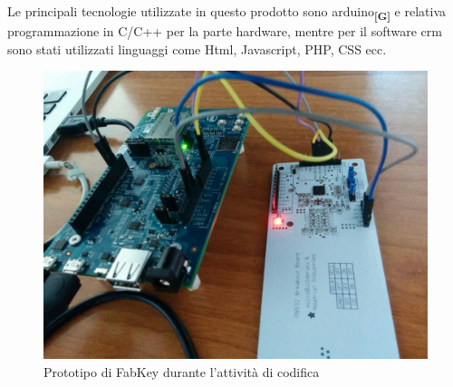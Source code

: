 Le principali tecnologie utilizzate in questo prodotto sono \gls{arduino}\textbf{\textsubscript{[G]}} e relativa programmazione in C/C++ per la parte hardware, mentre per il software crm sono stati utilizzati linguaggi come Html, Javascript, PHP, CSS ecc.

\begin{figure}[H]
	\begin{center}
	\includegraphics[scale=0.2]{immagini/fabkey.jpg}
	\caption{Prototipo di FabKey durante l'attività di codifica}
	\end{center}
\end{figure}





